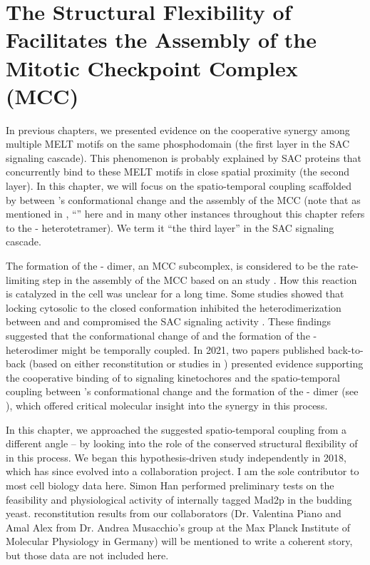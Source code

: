 \chapter{The Structural Flexibility of  Facilitates the Assembly of the Mitotic Checkpoint Complex (MCC)}
\label{chpt:4}

In previous chapters, we presented evidence on the cooperative synergy among multiple MELT motifs on the same  phosphodomain (the first layer in the SAC signaling cascade). This phenomenon is probably explained by SAC proteins that concurrently bind to these MELT motifs in close spatial proximity (the second layer). In this chapter, we will focus on the spatio-temporal coupling scaffolded by  between 's conformational change and the assembly of the MCC \cite{BUB1-CDC20-MAD1,Tripartite} (note that as mentioned in , ``'' here and in many other instances throughout this chapter refers to the - heterotetramer). We term it ``the third layer'' in the SAC signaling cascade. %

The formation of the - dimer, an MCC subcomplex, is considered to be the rate-limiting step in the assembly of the MCC based on an  study \cite{Faesen2017}. How this reaction is catalyzed in the cell was unclear for a long time. Some studies showed that locking cytosolic  to the closed conformation inhibited the heterodimerization between  and  and compromised the SAC signaling activity \cite{Ma+Poon2016,Ma+Poon2018,Kim2018}. These findings suggested that the conformational change of  and the formation of the - heterodimer might be temporally coupled. In 2021, two papers published back-to-back (based on either  reconstitution \cite{BUB1-CDC20-MAD1} or studies in  \cite{Tripartite}) presented evidence supporting the cooperative binding of  to signaling kinetochores and the spatio-temporal coupling between 's conformational change and the formation of the - dimer (see ), which offered critical molecular insight into the synergy in this process.

In this chapter, we approached the suggested spatio-temporal coupling from a different angle -- by looking into the role of the conserved structural flexibility of  in this process. We began this hypothesis-driven study independently in 2018, which has since evolved into a collaboration project. I am the sole contributor to most cell biology data here. Simon Han performed preliminary tests on the feasibility and physiological activity of internally tagged Mad2p in the budding yeast.  reconstitution results from our collaborators (Dr. Valentina Piano and Amal Alex from Dr. Andrea Musacchio's group at the Max Planck Institute of Molecular Physiology in Germany) will be mentioned to write a coherent story, but those data are not included here.

